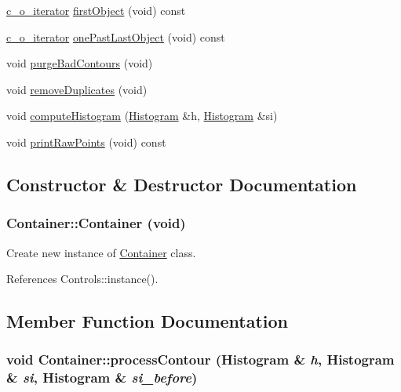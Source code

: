 \begin{CompactItemize}
\item 
\hyperlink{container_8h_7f50282a208c7aa7c7af7b64b603ce61}{c\_\-o\_\-iterator} \hyperlink{classContainer_b71691d8131f9f8b55f6b1c3fc15f347}{firstObject} (void) const 
\item 
\hyperlink{container_8h_7f50282a208c7aa7c7af7b64b603ce61}{c\_\-o\_\-iterator} \hyperlink{classContainer_56d09e1048b91a98d1103b6e4aea276e}{onePastLastObject} (void) const 
\item 
void \hyperlink{classContainer_6358cb40bedaead66e3a9294f9ffab00}{purgeBadContours} (void)
\item 
void \hyperlink{classContainer_91af554e6c26c2a24183475c4f1e225d}{removeDuplicates} (void)
\item 
void \hyperlink{classContainer_6840fd00ce36c59241488608bbbd8bde}{computeHistogram} (\hyperlink{classHistogram}{Histogram} \&h, \hyperlink{classHistogram}{Histogram} \&si)
\item 
void \hyperlink{classContainer_2e0f53094301a9dead5fdfa393fa5da8}{printRawPoints} (void) const 
\end{CompactItemize}


\subsection{Constructor \& Destructor Documentation}
\hypertarget{classContainer_5231ead51bcdd1a9b1f497414e76b6f4}{
\subsubsection[Container]{\setlength{\rightskip}{0pt plus 5cm}Container::Container (void)}}
\label{classContainer_5231ead51bcdd1a9b1f497414e76b6f4}


Create new instance of \hyperlink{classContainer}{Container} class. 

References Controls::instance().

\subsection{Member Function Documentation}
\hypertarget{classContainer_295064be4c1946c8e46211c8f99d8571}{
\subsubsection[processContour]{\setlength{\rightskip}{0pt plus 5cm}void Container::processContour ({\bf Histogram} \& {\em h}, \/  {\bf Histogram} \& {\em si}, \/  {\bf Histogram} \& {\em si\_\-before})}}
\label{classContainer_295064be4c1946c8e46211c8f99d8571}


